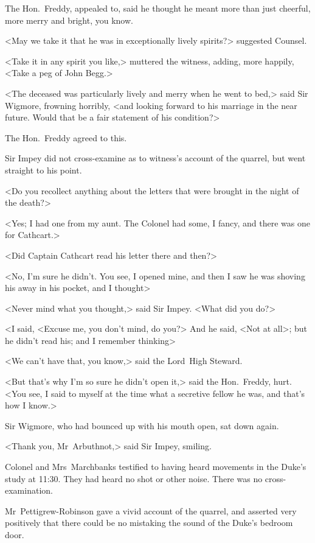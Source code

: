 The Hon.~Freddy, appealed to, said he thought he meant more than just cheerful, more merry and bright, you know.

<May we take it that he was in exceptionally lively spirits?> suggested Counsel.

<Take it in any spirit you like,> muttered the witness, adding, more happily, <Take a peg of John Begg.>

<The deceased was particularly lively and merry when he went to bed,> said Sir Wigmore, frowning horribly, <and looking forward to his marriage in the near future. Would that be a fair statement of his condition?>

The Hon.~Freddy agreed to this.

Sir Impey did not cross-examine as to witness's account of the quarrel, but went straight to his point.

<Do you recollect anything about the letters that were brought in the night of the death?>

<Yes; I had one from my aunt. The Colonel had some, I fancy, and there was one for Cathcart.>

<Did Captain Cathcart read his letter there and then?>

<No, I'm sure he didn't. You see, I opened mine, and then I saw he was shoving his away in his pocket, and I thought\longdash>

<Never mind what you thought,> said Sir Impey. <What did you do?>

<I said, <Excuse me, you don't mind, do you?> And he said, <Not at all>; but he didn't read his; and I remember thinking\longdash>

<We can't have that, you know,> said the Lord~High Steward.

<But that's why I'm so sure he didn't open it,> said the Hon.~Freddy, hurt. <You see, I said to myself at the time what a secretive fellow he was, and that's how I know.>

Sir Wigmore, who had bounced up with his mouth open, sat down again.

<Thank you, Mr~Arbuthnot,> said Sir Impey, smiling.

Colonel and Mrs~Marchbanks testified to having heard movements in the Duke's study at 11:30. They had heard no shot or other noise. There was no cross-examination.

Mr~Pettigrew-Robinson gave a vivid account of the quarrel, and asserted very positively that there could be no mistaking the sound of the Duke's bedroom door.

